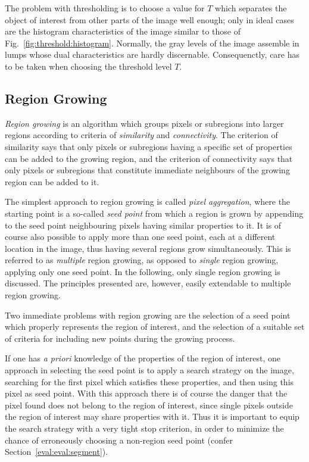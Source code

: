 The problem with thresholding is to choose a value for $T$ which
separates the object of interest from other parts of the image well
enough; only in ideal cases are the histogram characteristics of the
image similar to those of Fig.~\ref{fig:threshold:histogram}.
Normally, the gray levels of the image assemble in lumps whose dual
characteristics are hardly discernable.  Consequenctly, care has to be
taken when choosing the threshold level $T$.

\subsection{Region Growing}
\label{image:segment:region}

{\em Region growing\/} is an algorithm which groups pixels or
subregions into larger regions according to criteria of {\em
  similarity\/} and {\em connectivity\/}.  The criterion of similarity
says that only pixels or subregions having a specific set of
properties can be added to the growing region, and the criterion of
connectivity says that only pixels or subregions that constitute
immediate neighbours of the growing region can be added to it.

The simplest approach to region growing is called {\em pixel
  aggregation\/}, where the starting point is a so-called {\em seed
  point\/} from which a region is grown by appending to the seed point
neighbouring pixels having similar properties to it.  It is of course
also possible to apply more than one seed point, each at a different
location in the image, thus having several regions grow
simultaneously.  This is referred to as {\em multiple\/} region
growing, as opposed to {\em single\/} region growing, applying only
one seed point.  In the following, only single region growing is
discussed.  The principles presented are, however, easily extendable
to multiple region growing.

Two immediate problems with region growing are the selection of a seed
point which properly represents the region of interest, and the
selection of a suitable set of criteria for including new points
during the growing process.

If one has {\em a priori\/} knowledge of the properties of the region
of interest, one approach in selecting the seed point is to apply a
search strategy on the image, searching for the first pixel which
satisfies these properties, and then using this pixel as seed point.
With this approach there is of course the danger that the pixel found
does not belong to the region of interest, since single pixels outside
the region of interest may share properties with it.  Thus it is
important to equip the search strategy with a very tight stop
criterion, in order to minimize the chance of erroneously choosing a
non-region seed point (confer Section~\ref{eval:eval:segment}).

